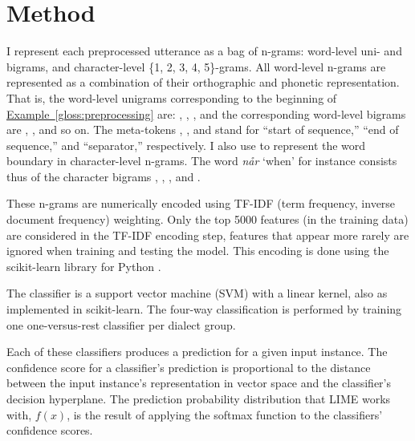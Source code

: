 \section{Method}
\label{sec:dialects-method}

I represent each preprocessed utterance as a bag of n-grams: word-level uni- and bigrams, and character-level \{1, 2, 3, 4, 5\}-grams.
All word-level n-grams are represented as a combination of their orthographic and phonetic representation.
That is, the word-level unigrams corresponding to the beginning of \hyperref[gloss:preprocessing]{Example~\ref*{gloss:preprocessing}} are: , , , and the corresponding word-level bigrams are , , and so on.
The meta-tokens \ngram{\sos{}}, \ngram{\eos{}}, and \ngram{\sep{}} stand for ``start of sequence,'' ``end of sequence,'' and ``separator,'' respectively.
I also use \ngram{\sep{}} to represent the word boundary in character-level n-grams.
The word \textit{når} `when' for instance consists thus of the character bigrams , , , and .

These n-grams are numerically encoded using TF-IDF (term frequency, inverse document frequency) weighting.
Only the top 5000 features (in the training data) are considered in the TF-IDF encoding step, features that appear more rarely are ignored when training and testing the model.
This encoding is done using the scikit-learn library for Python \citep{scikit-learn}.

The classifier is a support vector machine (SVM) with a linear kernel, also as implemented in scikit-learn.
The four-way classification is performed by training one one-versus-rest classifier per dialect group.

Each of these classifiers produces a prediction for a given input instance.
The confidence score for a classifier's prediction is proportional to the distance between the input instance's representation in vector space and the classifier's decision hyperplane.
The prediction probability distribution that LIME works with, $f(x)$, is the result of applying the softmax function to the classifiers' confidence scores.
